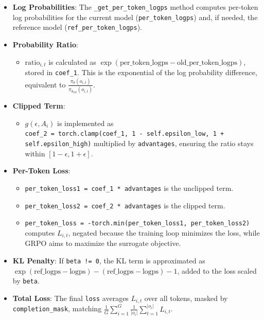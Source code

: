 \documentclass{article}
\begin{document}
\begin{itemize}
    \item \textbf{Log Probabilities}: The \texttt{\_get\_per\_token\_logps} method computes per-token log probabilities for the current model (\texttt{per\_token\_logps}) and, if needed, the reference model (\texttt{ref\_per\_token\_logps}).
    
    \item \textbf{Probability Ratio}:
    \begin{itemize}
        \item \( \text{ratio}_{i,t} \) is calculated as \( \exp(\text{per\_token\_logps} - \text{old\_per\_token\_logps}) \), stored in \texttt{coef\_1}. This is the exponential of the log probability difference, equivalent to \( \frac{\pi_\theta(o_{i,t})}{\pi_{\theta_{\text{old}}}(o_{i,t})} \).
    \end{itemize}
    
    \item \textbf{Clipped Term}:
    \begin{itemize}
        \item \( g(\epsilon, A_i) \) is implemented as\\
        \texttt{coef\_2 = torch.clamp(coef\_1, 1 - self.epsilon\_low, 1 + self.epsilon\_high)} multiplied by \texttt{advantages}, ensuring the ratio stays within \( [1 - \epsilon, 1 + \epsilon] \).
    \end{itemize}
    
    \item \textbf{Per-Token Loss}:
    \begin{itemize}
        \item \texttt{per\_token\_loss1 = coef\_1 * advantages} is the unclipped term.
        \item \texttt{per\_token\_loss2 = coef\_2 * advantages} is the clipped term.
        \item \texttt{per\_token\_loss = -torch.min(per\_token\_loss1, per\_token\_loss2)} computes \( L_{i,t} \), negated because the training loop minimizes the loss, while GRPO aims to maximize the surrogate objective.
    \end{itemize}
    
    \item \textbf{KL Penalty}: If \texttt{beta != 0}, the KL term is approximated as \( \exp(\text{ref\_logps} - \text{logps}) - (\text{ref\_logps} - \text{logps}) - 1 \), added to the loss scaled by \texttt{beta}.
    
    \item \textbf{Total Loss}: The final \texttt{loss} averages \( L_{i,t} \) over all tokens, masked by \texttt{completion\_mask}, matching \( \frac{1}{G} \sum_{i=1}^{G} \frac{1}{|o_i|} \sum_{t=1}^{|o_i|} L_{i,t} \).
\end{itemize}
\end{document}
